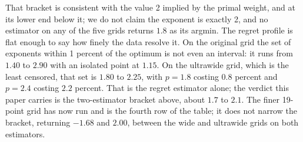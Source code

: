 That bracket is consistent with the value 2 implied by the primal weight, and at
its lower end below it; we do not claim the exponent is exactly 2, and no
estimator on any of the five grids returns $1.8$ as its argmin. The regret
profile is flat enough to say how finely the data resolve it. On the original
grid the set of exponents within 1 percent of the optimum is not even an
interval: it runs from $1.40$ to $2.90$ with an isolated point at $1.15$. On the
ultrawide grid, which is the least censored, that set is $1.80$ to $2.25$, with
$p = 1.8$ costing $0.8$ percent and $p = 2.4$ costing $2.2$ percent. That is the
regret estimator alone; the verdict this paper carries is the two-estimator
bracket above, about $1.7$ to $2.1$. The finer 19-point grid has now run and is
the fourth row of the table; it does not narrow
the bracket, returning $-1.68$ and $2.00$, between the wide and ultrawide grids
on both estimators.

